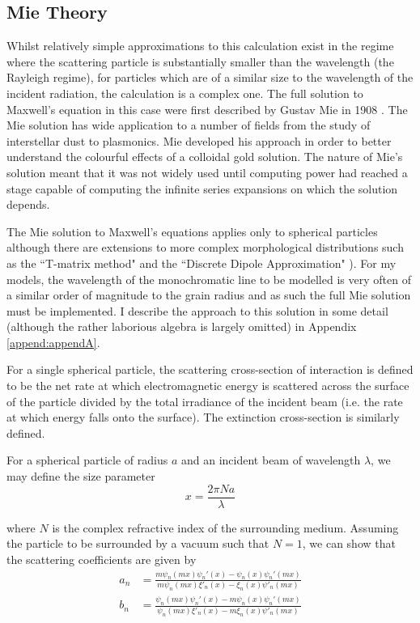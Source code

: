 \subsection{Mie Theory}
\label{scn:mie_theory}

Whilst relatively simple approximations to this calculation exist in the regime where the scattering particle is substantially smaller than the wavelength (the Rayleigh regime), for particles which are of a similar size to the wavelength of the incident radiation, the calculation is a complex one.  The full solution to Maxwell's equation in this case were first described by Gustav Mie in 1908 \citep{Mie1908}.  The Mie solution has wide application to a number of fields from the study of interstellar dust to plasmonics.  Mie developed his approach in order to better understand the colourful effects of a colloidal gold solution.  The nature of Mie's solution meant that it was not widely used until computing power had reached a stage capable of computing the infinite series expansions on which the solution depends.

The Mie solution to Maxwell's equations applies only to spherical particles although there are extensions to more complex morphological distributions such as the ``T-matrix method" and the ``Discrete Dipole Approximation" \citep{Mishchenko2002,Draine2004}).  For my models, the wavelength of the monochromatic line to be modelled is very often of a similar order of magnitude to the grain radius and as such the full Mie solution must be implemented.  I describe the approach to this solution in some detail (although the rather laborious algebra is largely omitted) in Appendix \ref{append:appendA}.  

For a single spherical particle, the scattering cross-section of interaction is defined to be the net rate at which electromagnetic energy is scattered across the surface of the particle divided by the total irradiance of the incident beam (i.e. the rate at which energy falls onto the surface).  The extinction cross-section is similarly defined.  

For a spherical particle of radius $a$ and an incident beam of wavelength $\lambda$, we may define the size parameter
\begin{equation}
x=\frac{2\pi N a}{\lambda}
\end{equation}

\noindent where $N$ is the complex refractive index of the surrounding medium.  Assuming the particle to be surrounded by a vacuum such that $N=1$, we can show that the scattering coefficients are given by 
\begin{align}
a_n &= \frac{m\psi_n(mx)\psi_n'(x)-\psi_n(x)\psi_n'(mx)}{m\psi_n(mx)\xi'_n(x)-\xi_n(x)\psi'_n(mx)} \\[2ex]
b_n &= \frac{\psi_n(mx)\psi_n'(x)-m\psi_n(x)\psi_n'(mx)}{\psi_n(mx)\xi'_n(x)-m\xi_n(x)\psi'_n(mx)}
\end{align}


